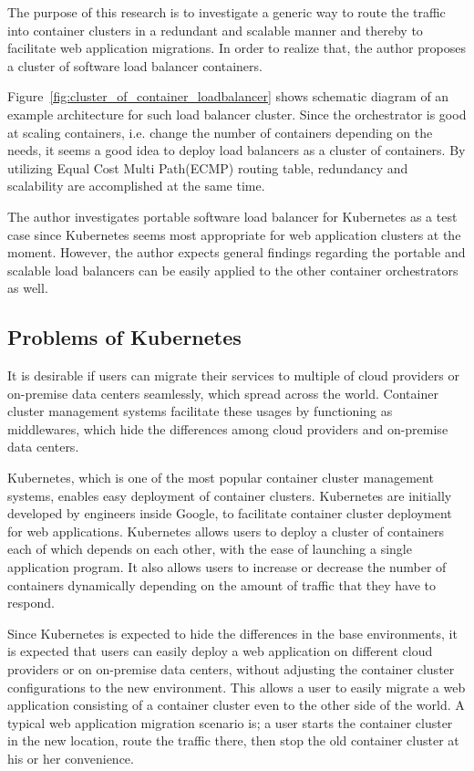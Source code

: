 The purpose of this research is to investigate a generic way to route the traffic into container clusters in a redundant and scalable manner and thereby to facilitate web application migrations.
In order to realize that, the author proposes a cluster of software load balancer containers.

Figure~\ref{fig:cluster_of_container_loadbalancer} shows schematic diagram of an example architecture for such load balancer cluster.
Since the orchestrator is good at scaling containers, i.e. change the number of containers depending on the needs,
it seems a good idea to deploy load balancers as a cluster of containers.
By utilizing Equal Cost Multi Path(ECMP) routing table, redundancy and scalability are accomplished at the same time.

The author investigates portable software load balancer for Kubernetes as a test case since Kubernetes seems most appropriate for web application clusters at the moment.
However, the author expects general findings regarding the portable and scalable load balancers can be easily applied to the other container orchestrators as well.

\subsection{Problems of Kubernetes}

It is desirable if users can migrate their services to multiple of cloud providers or on-premise data centers seamlessly, which spread across the world.
Container cluster management systems facilitate these usages by functioning as middlewares, which hide the differences among cloud providers and on-premise data centers.

Kubernetes\cite{K8s2017}, which is one of the most popular container cluster management systems, enables easy deployment of container clusters.
Kubernetes are initially developed by engineers inside Google, to facilitate container cluster deployment for web applications.
Kubernetes allows users to deploy a cluster of containers each of which depends on each other, with the ease of launching a single application program.
It also allows users to increase or decrease the number of containers dynamically depending on the amount of traffic that they have to respond.

Since Kubernetes is expected to hide the differences in the base environments, it is expected that users can easily deploy a web application on different cloud providers or on on-premise data centers, without adjusting the container cluster configurations to the new environment. 
This allows a user to easily migrate a web application consisting of a container cluster even to the other side of the world.
A typical web application migration scenario is; 
a user starts the container cluster in the new location, route the traffic there, then stop the old container cluster at his or her convenience.


